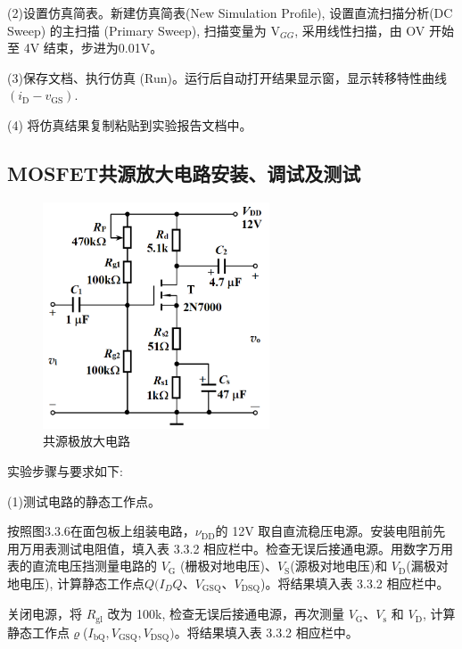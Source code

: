 \documentclass[a4paper,11pt,UTF8]{article}
\numberwithin{equation}{subsection}
\begin{document}
(2)设置仿真简表。新建仿真简表(New Simulation Profile), 设置直流扫描分析(DC Sweep)
的主扫描 (Primary Sweep), 扫描变量为 V$_{GG}$, 采用线性扫描，由 OV 开始至 4V 结束，步进为0.01V。

(3)保存文档、执行仿真 (Run)。运行后自动打开结果显示窗，显示转移特性曲线 $(i_\mathrm{D}-v_{\mathrm{GS}})$.

(4) 将仿真结果复制粘贴到实验报告文档中。

\subsection{MOSFET共源放大电路安装、调试及测试}
\begin{figure}[H]
	\centering
	\includegraphics[width=0.6\textwidth]{2.2}
	\caption{共源极放大电路}
\end{figure}

实验步骤与要求如下:

(1)测试电路的静态工作点。 

 按照图3.3.6在面包板上组装电路，$\nu_\mathrm{DD}$的 12V 取自直流稳压电源。安装电阻前先用万用表测试电阻值，填入表 3.3.2 相应栏中。检查无误后接通电源。用数字万用表的直流电压挡测量电路的 $V_\mathrm{G}$ (栅极对地电压)、$V_\mathrm{S}$(源极对地电压)和 $V_\mathrm{D}$(漏极对地电压), 计算静态工作点$Q(I_DQ$、$V_\mathrm{GSQ}$、$V_\mathrm{DSQ}$)。将结果填入表 3.3.2 相应栏中。

关闭电源，将 $R_\mathrm{gl}$ 改为 100k, 检查无误后接通电源，再次测量 $V_\mathrm{G}$、$V_\mathrm{s}$ 和 $V_\mathrm{D}$, 计算静态工作点$\varrho$($I_\mathrm{bQ},V_\mathrm{GSQ},V_\mathrm{DSQ})$。将结果填入表 3.3.2 相应栏中。
\end{document}
